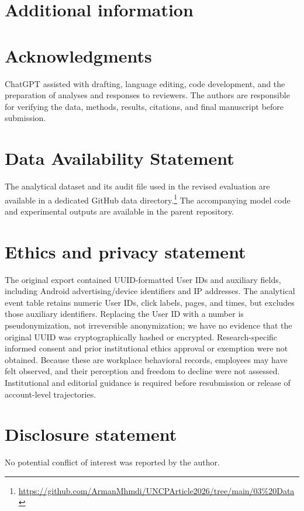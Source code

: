 \documentclass[sn-mathphys-num, Numbered]{sn-jnl}%
\theoremstyle{thmstyleone}%
\theoremstyle{thmstyletwo}%
\theoremstyle{thmstylethree}%
\begin{document}
\section*{Additional information}

\section*{Acknowledgments}
ChatGPT assisted with drafting, language editing, code development, and the preparation of analyses and responses to reviewers. The authors are responsible for verifying the data, methods, results, citations, and final manuscript before submission.

\section*{Data Availability Statement}
The analytical dataset and its audit file used in the revised evaluation are available in a dedicated GitHub data directory.\footnote{\url{https://github.com/ArmanMhmdi/UNCPArticle2026/tree/main/03\%20Data}} The accompanying model code and experimental outputs are available in the parent repository.

\section*{Ethics and privacy statement}
The original export contained UUID-formatted User IDs and auxiliary fields, including Android advertising/device identifiers and IP addresses. The analytical event table retains numeric User IDs, click labels, pages, and times, but excludes those auxiliary identifiers. Replacing the User ID with a number is pseudonymization, not irreversible anonymization; we have no evidence that the original UUID was cryptographically hashed or encrypted. Research-specific informed consent and prior institutional ethics approval or exemption were not obtained. Because these are workplace behavioral records, employees may have felt observed, and their perception and freedom to decline were not assessed. Institutional and editorial guidance is required before resubmission or release of account-level trajectories.



\section*{Disclosure statement}
No potential conflict of interest was reported by the author.
\end{document}
